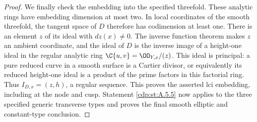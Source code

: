 \begin{proof}
We finally check the embedding into the specified
threefold. These analytic rings have embedding
dimension at most two. In local coordinates of the
smooth threefold, the tangent space of $D$ therefore
has codimension at least one. There is an element
$z$ of its ideal with $dz(x)\ne0$. The inverse
function theorem makes $z$ an ambient coordinate,
and the ideal of $D$ is the inverse image of a
height-one ideal in the regular analytic ring
$\C\{u,v\}=\OO_{Y,x}/(z)$. This ideal is principal:
a pure reduced curve in a smooth surface is a Cartier
divisor, or equivalently its reduced height-one ideal
is a product of the prime factors in this factorial
ring. Thus $I_{D,x}=(z,h)$, a regular sequence.
This proves the asserted lci embedding, including
at the node and cusp. Statement \ref{cdp:st:A.5.5} now applies
to the three specified generic transverse types
and proves the final smooth elliptic and constant-type
conclusion.
\end{proof}


